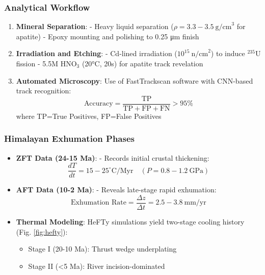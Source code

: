 \documentclass{article}
\begin{document}
\subsubsection*{Analytical Workflow}
\begin{enumerate}
    \item \textbf{Mineral Separation}:  
    - Heavy liquid separation (\(\rho = 3.3-3.5\ \text{g/cm}^3\) for apatite)  
    - Epoxy mounting and polishing to 0.25 μm finish
    
    \item \textbf{Irradiation and Etching}:  
    - Cd-lined irradiation (\(10^{15}\ \text{n/cm}^2\)) to induce \(^{235}\text{U}\) fission  
    - 5.5M HNO\(_3\) (20°C, 20s) for apatite track revelation
    
    \item \textbf{Automated Microscopy}:  
    Use of FastTrackscan software with CNN-based track recognition:
    \begin{equation}
        \text{Accuracy} = \frac{\text{TP}}{\text{TP} + \text{FP} + \text{FN}} > 95\% 
        \label{eq:cnn_acc}
    \end{equation}
    where TP=True Positives, FP=False Positives \cite{Gleadow2015}
\end{enumerate}

\subsubsection*{Himalayan Exhumation Phases}
\begin{itemize}
    \item \textbf{ZFT Data (24-15 Ma)}:  
    - Records initial crustal thickening:  
    \begin{equation}
        \frac{dT}{dt} = 15-25^\circ \text{C/Myr} \quad (P = 0.8-1.2\ \text{GPa})
        \label{eq:zft_cooling}
    \end{equation}
    
    \item \textbf{AFT Data (10-2 Ma)}:  
    - Reveals late-stage rapid exhumation:  
    \begin{equation}
        \text{Exhumation Rate} = \frac{\Delta z}{\Delta t} = 2.5-3.8\ \text{mm/yr}
        \label{eq:exhum_rate}
    \end{equation}
    
    \item \textbf{Thermal Modeling}:  
    HeFTy simulations yield two-stage cooling history (Fig. \ref{fig:hefty}):
    \begin{itemize}
        \item Stage I (20-10 Ma): Thrust wedge underplating  
        \item Stage II (<5 Ma): River incision-dominated
    \end{itemize}
\end{itemize}
\end{document}
